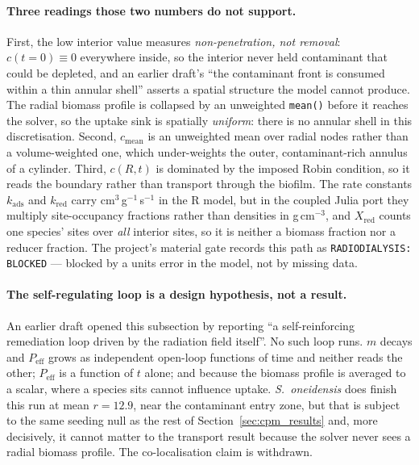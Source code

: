 \documentclass[11pt]{article}
\begin{document}
\paragraph{Three readings those two numbers do not support.}
First, the low interior value measures \emph{non-penetration, not removal}: $c(t = 0) \equiv 0$
everywhere inside, so the interior never held contaminant that could be depleted, and an earlier
draft's ``the contaminant front is consumed within a thin annular shell'' asserts a spatial
structure the model cannot produce. The radial biomass profile is collapsed by an unweighted
\texttt{mean()} before it reaches the solver, so the uptake sink is spatially \emph{uniform}:
there is no annular shell in this discretisation. Second, $c_{\mathrm{mean}}$ is an unweighted mean
over radial nodes rather than a volume-weighted one, which under-weights the outer, contaminant-rich
annulus of a cylinder. Third, $c(R,t)$ is dominated by the imposed Robin condition, so it reads the
boundary rather than transport through the biofilm. The rate constants
$k_{\mathrm{ads}}$ and $k_{\mathrm{red}}$ carry cm$^3$\,g$^{-1}$\,s$^{-1}$ in the R model, but in
the coupled Julia port they multiply site-occupancy fractions rather than densities in
g\,cm$^{-3}$, and $X_{\mathrm{red}}$ counts one species' sites over \emph{all} interior sites, so
it is neither a biomass fraction nor a reducer fraction. The project's material gate records this
path as \texttt{RADIODIALYSIS: BLOCKED} --- blocked by a units error in the model, not by missing
data.

\paragraph{The self-regulating loop is a design hypothesis, not a result.}
An earlier draft opened this subsection by reporting ``a self-reinforcing remediation loop driven by
the radiation field itself''. No such loop runs. $m$ decays and $P_{\mathrm{eff}}$ grows as
independent open-loop functions of time and neither reads the other; $P_{\mathrm{eff}}$ is a
function of $t$ alone; and because the biomass profile is averaged to a scalar, where a species sits
cannot influence uptake. \textit{S.~oneidensis} does finish this run at mean $r = 12.9$, near the
contaminant entry zone, but that is subject to the same seeding null as the rest of
Section~\ref{sec:cpm_results} and, more decisively, it cannot matter to the transport result
because the solver never sees a radial biomass profile. The co-localisation claim is withdrawn.
\end{document}
